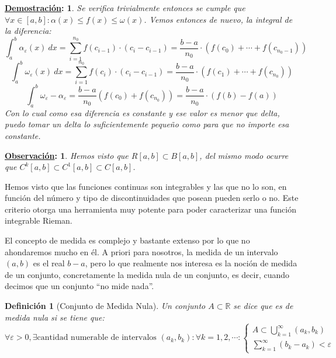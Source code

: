 \documentclass[10pt,a4paper,openright]{book}
\theoremstyle{break}
\newtheorem*{defi}{Definición}
\newtheorem*{demo}{\underline{Demostración}:}
\newtheorem*{obs}{\underline{Observación}:}
\newcommand{\dif}[1]{\ d#1}
\begin{document}
\begin{demo}
Se verifica trivialmente entonces se cumple que $\forall x\in [a,b]: \alpha(x)\leq f(x)\leq \omega(x)$. Vemos entonces de nuevo, la integral de la diferencia:
$$\int_{a}^{b}\alpha_\varepsilon(x) \dif{x} = \sum_{i = 1}^{n_0} f(c_{i-1})\cdot (c_i-c_{i-1}) = \frac{b-a}{n_0} \cdot (f(c_0)+\cdots + f(c_{n_0-1}))$$
$$\int_{a}^{b}\omega_\varepsilon(x) \dif{x} = \sum_{i = 1}^{n_0} f(c_i)\cdot (c_i-c_{i-1}) = \frac{b-a}{n_0} \cdot (f(c_1)+\cdots + f(c_{n_0}))$$
$$\int_{a}^{b} \omega_\varepsilon - \alpha_\varepsilon = \frac{b-a}{n_0}(f(c_0)+f(c_{n_0})) = \frac{b-a}{n_0}\cdot (f(b)-f(a))$$
Con lo cual como esa diferencia es constante y ese valor es menor que delta, puedo tomar un delta lo suficientemente pequeño como para que no importe esa constante.
\end{demo}

\begin{obs}
Hemos visto que $R[a,b]\subset B[a,b]$, del mismo modo ocurre que $C^k[a,b]\subset C^{1}[a,b]\subset C[a,b]$.
\end{obs}

Hemos visto que las funciones continuas son integrables y las que no lo son, en función del número y tipo de discontinuidades que posean pueden serlo o no. Este criterio otorga una herramienta muy potente para poder caracterizar una función integrable Rieman.

El concepto de medida es complejo y bastante extenso por lo que no ahondaremos mucho en él. A priori para nosotros, la medida de un intervalo $(a,b)$ es el real $b-a$, pero lo que realmente nos interesa es la noción de medida de un conjunto, concretamente la medida nula de un conjunto, es decir, cuando decimos que un conjunto ``no mide nada''. 

\begin{defi}[Conjunto de Medida Nula]
Un conjunto $A\subset \mathbb R$ se dice que es de medida nula si se tiene que:
$$\forall \varepsilon > 0, \exists \mbox{cantidad numerable de intervalos }(a_k,b_k):\forall k = 1,2,\cdots: \begin{cases} A \displaystyle \subset  \displaystyle\bigcup^\infty_{k=1}(a_k,b_k) \\ \displaystyle \sum_{k=1}^{\infty} (b_k - a_k) < \varepsilon\end{cases}$$
\end{defi}
\end{document}
